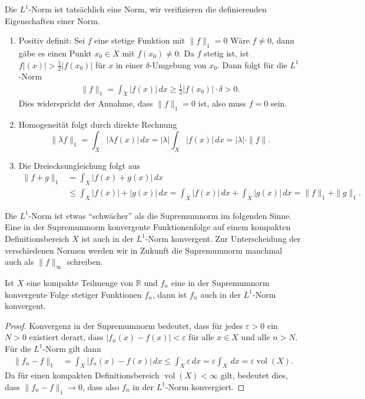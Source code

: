 Die $L^1$-Norm ist tatsächlich eine Norm, wir verifizieren die
definierenden Eigenschaften einer Norm.
\begin{enumerate}
\item
Positiv definit: Sei $f$ eine stetige Funktion mit $\|f\|_1=0$
Wäre $f\ne 0$, dann gäbe es einen Punkt $x_0\in X$ mit $f(x_0) \ne 0$.
Da $f$ stetig ist, ist $f|(x)| > \frac12|f(x_0)|$ für $x$ in einer
$\delta$-Umgebung von $x_0$.
Dann folgt für die $L^1$-Norm
\begin{align*}
\|f\|_1
=
\int_X |f(x)|\,dx
\ge
\frac12 |f(x_0)| \cdot \delta 
> 0.
\end{align*}
Dies widerspricht der Annahme, dass $\|f\|_1=0$ ist, also muss $f=0$ sein.
\item
Homogeneität folgt durch direkte Rechnung
\[
\|\lambda f\|_1
=
\int_X |\lambda f(x)|\,dx
=
|\lambda|
\int_X |f(x)|\,dx
=
|\lambda| \cdot \|f\|.
\]
\item
Die Dreiecksungleichung folgt aus
\begin{align*}
\|f+g\|_1
&=
\int_X |f(x) + g(x)|\,dx
\\
&\le
\int_X |f(x)| + |g(x)|\,dx
=
\int_X |f(x)|\,dx + \int_X |g(x)|\,dx
=
\|f\|_1 + \|g\|_1.
\end{align*}
\end{enumerate}
Die $L^1$-Norm ist etwas ``schwächer'' als die Supremumnorm im
folgenden Sinne.
Eine in der Supremumnorm konvergente Funktionenfolge auf einem
kompakten Definitionsbereich $X$ ist auch in der $L^1$-Norm konvergent.
Zur Unterscheidung der verschiedenen Normen werden wir in Zukunft die
Supremumnorm manchmal auch als $\|f\|_{\infty}$ schreiben.

\begin{satz}
Ist $X$ eine kompakte Teilmenge von $\mathbb{R}$ und $f_n$ eine
in der Supremumnorm konvergente Folge stetiger Funktionen $f_n$,
dann ist $f_n$ auch in der $L^1$-Norm konvergent.
\end{satz}

\begin{proof}
Konvergenz in der Supremumnorm bedeutet, dass für jedes $\varepsilon>0$
ein $N>0$ existiert derart, dass $|f_n(x)-f(x)|<\varepsilon$ für alle
$x\in X$ und alle $n>N$.
Für die $L^1$-Norm gilt dann
\begin{align*}
\|f_n-f\|_1
&=
\int_X |f_n(x) - f(x)|\,dx
\le
\int_X \varepsilon \,dx
=
\varepsilon \int_X \,dx
=
\varepsilon \operatorname{vol}(X).
\end{align*}
Da für einen kompakten Definitionsbereich $\operatorname{vol}(X)<\infty$
gilt, bedeutet dies, dass $\|f_n-f\|_1\to 0$, dass also $f_n$ in
der $L^1$-Norm konvergiert.
\end{proof}

